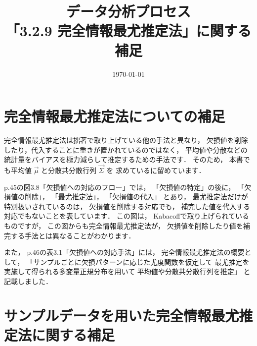 \documentclass[a4j]{jarticle}\usepackage[]{graphicx}\usepackage[]{color}
\title{データ分析プロセス\\「3.2.9 完全情報最尤推定法」に関する補足}
\date{\today}
\begin{document}
\maketitle


%

\section{完全情報最尤推定法についての補足}

完全情報最尤推定法は拙著で取り上げている他の手法と異なり，
欠損値を削除したり，代入することに重きが置かれているのではなく，
平均値や分散などの統計量をバイアスを極力減らして推定するための手法です．
そのため，
本書でも平均値 $\vec{\mu}$ と分散共分散行列 $\vec{\Sigma}$ を
求めているに留めています．

p.45の図3.8「欠損値への対応のフロー」では，
「欠損値の特定」の後に，
「欠損値の削除」，
「最尤推定法」，
「欠損値の代入」
とあり，
最尤推定法だけが特別扱いされているのは，
欠損値を削除する対応でも，
補完した値を代入する対応でもないことを表しています．
この図は，
Kabacoff\cite{Kabacoff2011}で取り上げられているものですが，
この図からも完全情報最尤推定法が，
欠損値を削除したり値を補完する手法とは異なることがわかります．

また，
p.46の表3.1「欠損値への対応手法」には，
完全情報最尤推定法の概要として，
「サンプルごとに欠損パターンに応じた尤度関数を仮定して
最尤推定を実施して得られる多変量正規分布を用いて
平均値や分散共分散行列を推定」
と記載しました．



\section{サンプルデータを用いた完全情報最尤推定法に関する補足}
\end{document}
